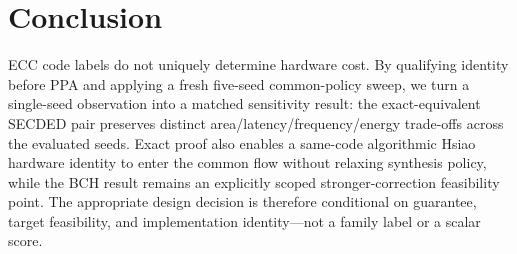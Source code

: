 \section{Conclusion}

ECC code labels do not uniquely determine hardware cost. By qualifying identity before PPA and applying a fresh five-seed common-policy sweep, we turn a single-seed observation into a matched sensitivity result: the exact-equivalent SECDED pair preserves distinct area/latency/frequency/energy trade-offs across the evaluated seeds. Exact proof also enables a same-code algorithmic Hsiao hardware identity to enter the common flow without relaxing synthesis policy, while the BCH result remains an explicitly scoped stronger-correction feasibility point. The appropriate design decision is therefore conditional on guarantee, target feasibility, and implementation identity—not a family label or a scalar score.
